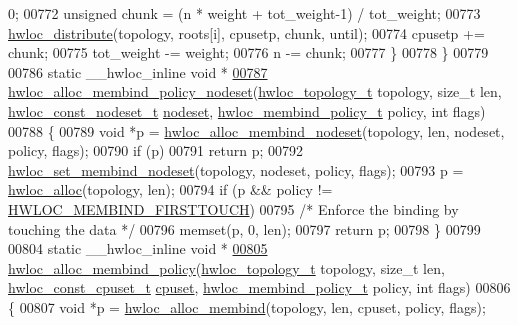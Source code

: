 \begin{DoxyCode}
      0;
00772     \textcolor{keywordtype}{unsigned} chunk = (n * weight + tot\_weight-1) / tot\_weight;
00773     \hyperlink{a00059_ga6d5c88292ad5aa062c1bebc99369c042}{hwloc_distribute}(topology, roots[i], cpusetp, chunk, until);
00774     cpusetp += chunk;
00775     tot\_weight -= weight;
00776     n -= chunk;
00777   \}
00778 \}
00779 
00786 \textcolor{keyword}{static} \_\_hwloc\_inline \textcolor{keywordtype}{void} *
\hypertarget{a00031_source_l00787}{}\hyperlink{a00059_ga3e772fbc4de626ed80f13d332b7d4d03}{00787} \hyperlink{a00059_ga3e772fbc4de626ed80f13d332b7d4d03}{hwloc_alloc_membind_policy_nodeset}(\hyperlink{a00039_ga9d1e76ee15a7dee158b786c30b6a6e38}{hwloc_topology_t} topology, \textcolor{keywordtype}{size\_t} len, 
      \hyperlink{a00040_ga2f5276235841ad66a79bedad16a5a10c}{hwloc_const_nodeset_t} \hyperlink{a00016_a08f0d0e16c619a6e653526cbee4ffea3}{nodeset}, \hyperlink{a00050_gac9764f79505775d06407b40f5e4661e8}{hwloc_membind_policy_t} policy, \textcolor{keywordtype}{int} flags)
00788 \{
00789   \textcolor{keywordtype}{void} *p = \hyperlink{a00050_gaeaa00714a9c4319bda0a74ca6f8720e8}{hwloc_alloc_membind_nodeset}(topology, len, nodeset, policy, flags);
00790   \textcolor{keywordflow}{if} (p)
00791     \textcolor{keywordflow}{return} p;
00792   \hyperlink{a00050_ga747962cbb16fd12ad6d126011c734a27}{hwloc_set_membind_nodeset}(topology, nodeset, policy, flags);
00793   p = \hyperlink{a00050_gac5586e58cf25c3596b7d4aa31ce13259}{hwloc_alloc}(topology, len);
00794   \textcolor{keywordflow}{if} (p && policy != \hyperlink{a00050_ggac9764f79505775d06407b40f5e4661e8a979c7aa78dd32780858f30f47a72cca0}{HWLOC_MEMBIND_FIRSTTOUCH})
00795     \textcolor{comment}{/* Enforce the binding by touching the data */}
00796     memset(p, 0, len);
00797   \textcolor{keywordflow}{return} p;
00798 \}
00799 
00804 \textcolor{keyword}{static} \_\_hwloc\_inline \textcolor{keywordtype}{void} *
\hypertarget{a00031_source_l00805}{}\hyperlink{a00059_ga6178c6a9ec1dd88ec9f6a9fcdcc7d634}{00805} \hyperlink{a00059_ga6178c6a9ec1dd88ec9f6a9fcdcc7d634}{hwloc_alloc_membind_policy}(\hyperlink{a00039_ga9d1e76ee15a7dee158b786c30b6a6e38}{hwloc_topology_t} topology, \textcolor{keywordtype}{size\_t} len, 
      \hyperlink{a00040_ga1f784433e9b606261f62d1134f6a3b25}{hwloc_const_cpuset_t} \hyperlink{a00016_a67925e0f2c47f50408fbdb9bddd0790f}{cpuset}, \hyperlink{a00050_gac9764f79505775d06407b40f5e4661e8}{hwloc_membind_policy_t} policy, \textcolor{keywordtype}{int} flags)
00806 \{
00807   \textcolor{keywordtype}{void} *p = \hyperlink{a00050_ga221a7edc5d436300374fa16463f607e5}{hwloc_alloc_membind}(topology, len, cpuset, policy, flags);

\end{DoxyCode}
